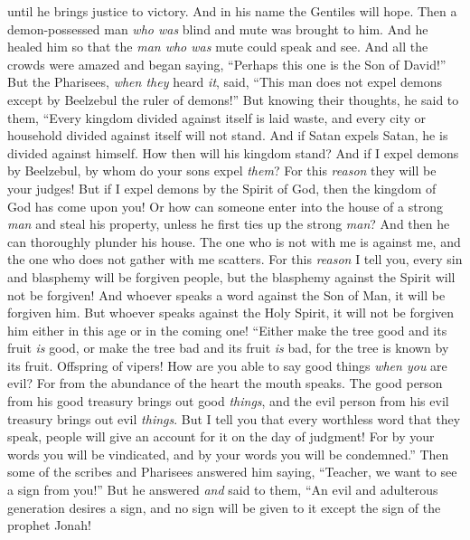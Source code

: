 \begin{biblechapter}
until he brings justice to victory.
\verse And in his name the Gentiles will hope.
 Then a demon-possessed man \textit{who was} blind and mute was brought to him. And he healed him so that the \textit{man who was} mute could speak and see.
\verse And all the crowds were amazed and began saying, “Perhaps this one is the Son of David!”
\verse But the Pharisees, \textit{when they} heard \textit{it}, said, “This man does not expel demons except by Beelzebul the ruler of demons!”
\verse But knowing their thoughts, he said to them, “Every kingdom divided against itself is laid waste, and every city or household divided against itself will not stand.
\verse And if Satan expels Satan, he is divided against himself. How then will his kingdom stand?
\verse And if I expel demons by Beelzebul, by whom do your sons expel \textit{them}? For this \textit{reason} they will be your judges!
\verse But if I expel demons by the Spirit of God, then the kingdom of God has come upon you!
\verse Or how can someone enter into the house of a strong \textit{man} and steal his property, unless he first ties up the strong \textit{man}? And then he can thoroughly plunder his house.
\verse The one who is not with me is against me, and the one who does not gather with me scatters.
\verse For this \textit{reason} I tell you, every sin and blasphemy will be forgiven people, but the blasphemy against the Spirit will not be forgiven!
\verse And whoever speaks a word against the Son of Man, it will be forgiven him. But whoever speaks against the Holy Spirit, it will not be forgiven him either in this age or in the coming one!
 “Either make the tree good and its fruit \textit{is} good, or make the tree bad and its fruit \textit{is} bad, for the tree is known by its fruit.
\verse Offspring of vipers! How are you able to say good things \textit{when you} are evil? For from the abundance of the heart the mouth speaks.
\verse The good person from his good treasury brings out good \textit{things}, and the evil person from his evil treasury brings out evil \textit{things}.
\verse But I tell you that every worthless word that they speak, people will give an account for it on the day of judgment!
\verse For by your words you will be vindicated, and by your words you will be condemned.”
 Then some of the scribes and Pharisees answered him saying, “Teacher, we want to see a sign from you!”
\verse But he answered \textit{and} said to them, “An evil and adulterous generation desires a sign, and no sign will be given to it except the sign of the prophet Jonah!

\end{biblechapter}
